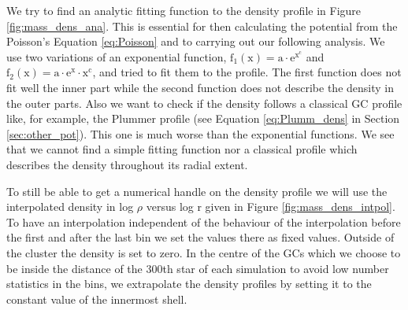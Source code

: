 \par We try to find an analytic fitting function to the density profile in Figure \ref{fig:mass_dens_ana}. This is essential for then calculating the potential from the Poisson's Equation \eqref{eq:Poisson} and to carrying out our following analysis. We use two variations of an exponential function, $\mathrm{f_1(x)=a\cdot e^{x^c}}$ and $\mathrm{f_2(x)=a\cdot e^{x}\cdot x^c}$, and tried to fit them to the profile. The first function does not fit well the inner part while the second function does not describe the density in the outer parts. Also we want to check if the density follows a classical \ac{GC} profile like, for example, the Plummer profile (see Equation \ref{eq:Plumm_dens} in Section \ref{sec:other_pot}). This one is much worse than the exponential functions. We see that we cannot find a simple fitting function nor a classical profile which describes the density throughout its radial extent. \par To still be able to get a numerical handle on the density profile we will use the interpolated density in log $\rho$ versus log r given in Figure \ref{fig:mass_dens_intpol}. To have an interpolation independent of the behaviour of the interpolation before the first and after the last bin we set the values there as fixed values. Outside of the cluster the density is set to zero. In the centre of the \acp{GC} which we choose to be inside the distance of the 300th star of each simulation to avoid low number statistics in the bins, we extrapolate the density profiles by setting it to the constant value of the innermost shell. 

